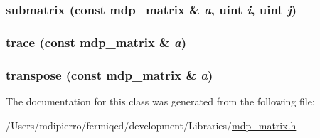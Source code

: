 \label{classmdp__matrix_ae7a9b12e9cedc3d6f274c9fe9eb44332}
\hypertarget{classmdp__matrix_a28a3f69388892b5b30aad614ed75e375}{
\subsubsection[{submatrix}]{ submatrix (const {\bf mdp\_\-matrix} \& {\em a}, \/  {\bf uint} {\em i}, \/  {\bf uint} {\em j})}}
\label{classmdp__matrix_a28a3f69388892b5b30aad614ed75e375}
\hypertarget{classmdp__matrix_a5336fdab3a6eaa9888c91833f251f4e0}{
\subsubsection[{trace}]{ trace (const {\bf mdp\_\-matrix} \& {\em a})}}
\label{classmdp__matrix_a5336fdab3a6eaa9888c91833f251f4e0}
\hypertarget{classmdp__matrix_a271d6793f4231f7b290179bff594e8d1}{
\subsubsection[{transpose}]{ transpose (const {\bf mdp\_\-matrix} \& {\em a})}}
\label{classmdp__matrix_a271d6793f4231f7b290179bff594e8d1}


The documentation for this class was generated from the following file:\begin{DoxyCompactItemize}
\item 
/Users/mdipierro/fermiqcd/development/Libraries/\hyperlink{mdp__matrix_8h}{mdp\_\-matrix.h}\end{DoxyCompactItemize}
